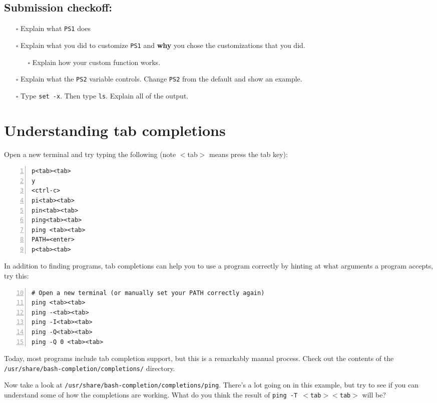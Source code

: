 \documentclass{article}
\begin{document}
\subsection*{Submission checkoff:}
\begin{itemize}
  \item[$\square$] Explain what \texttt{PS1} does
  \item[$\square$] Explain what you did to customize \texttt{PS1} and
    \textbf{why} you chose the customizations that you did.
    \begin{itemize}
      \item[$\square$] Explain how your custom function works.
    \end{itemize}
  \item[$\square$] Explain what the \texttt{PS2} variable controls. Change
    \texttt{PS2} from the default and show an example.
  \item[$\square$] Type \texttt{set -x}. Then type \texttt{ls}. Explain
    all of the output.
\end{itemize}


\section{Understanding tab completions}

\medskip
\noindent
Open a new terminal and try typing the following (note $<$tab$>$ means press
the tab key):

\begin{lstlisting}[numbers=left]
p<tab><tab>
y
<ctrl-c>
pi<tab><tab>
pin<tab><tab>
ping<tab><tab>
ping <tab><tab>
PATH=<enter>
p<tab><tab>
\end{lstlisting}

\medskip
\noindent
In addition to finding programs, tab completions can help you to use a program
correctly by hinting at what arguments a program accepts, try this:

\begin{lstlisting}[numbers=left,firstnumber=10]
# Open a new terminal (or manually set your PATH correctly again)
ping <tab><tab>
ping -<tab><tab>
ping -I<tab><tab>
ping -Q<tab><tab>
ping -Q 0 <tab><tab>
\end{lstlisting}

\noindent
Today, most programs include tab completion support, but this is a remarkably
manual process. Check out the contents of the
\texttt{/usr/share/bash-completion/completions/} directory.

\medskip
\noindent
Now take a look at \texttt{/usr/share/bash-completion/completions/ping}.
There's a lot going on in this example, but try to see if you can understand
some of how the completions are working. What do you think the result of
\texttt{ping~-T~$<$tab$><$tab$>$} will be?
\end{document}

